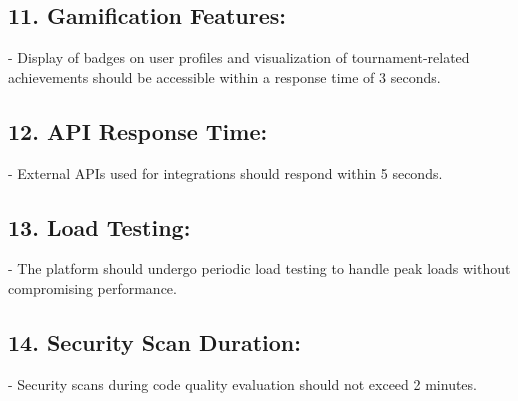 \subsection*{11. Gamification Features:}
    - Display of badges on user profiles and visualization of tournament-related achievements should be accessible within a response time of 3 seconds.

\subsection*{12. API Response Time:}
    - External APIs used for integrations should respond within 5 seconds.

\subsection*{13. Load Testing:}
    - The platform should undergo periodic load testing to handle peak loads without compromising performance.

\subsection*{14. Security Scan Duration:}
    - Security scans during code quality evaluation should not exceed 2 minutes.







